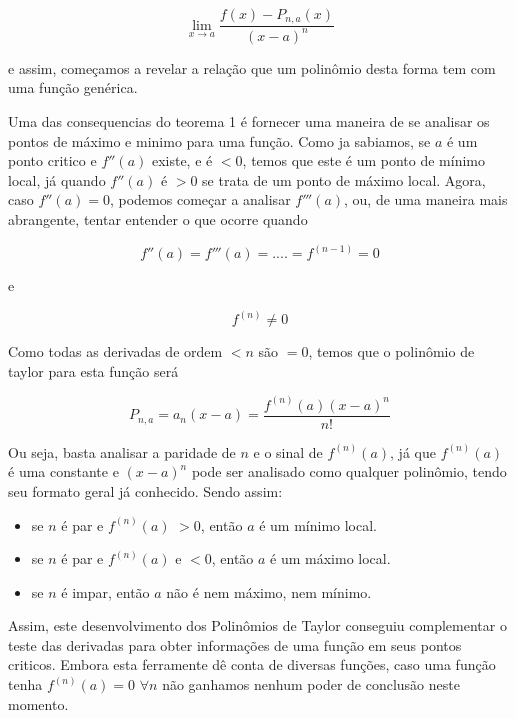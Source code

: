 \documentclass[a4paper, 12pt]{article}
\begin{document}
\begin{equation}
	\nonumber \lim_{x \to a } \frac{f(x) - P_{n,a}(x)}{(x-a)^n}
\end{equation}

e assim, começamos a revelar a relação que um polinômio desta forma tem com uma
função genérica.

Uma das consequencias do teorema 1 é fornecer uma maneira de se analisar os pontos de
máximo e minimo para uma função. Como ja sabiamos, se $a$ é um ponto critico e $f''(a)$ existe,
e é $ < 0$, temos que este é um ponto de mínimo local, já quando $f''(a)$ é $ > 0$ se trata de um ponto
de máximo local. Agora, caso $f''(a) = 0$, podemos começar a analisar $f'''(a)$, ou,
de uma maneira mais abrangente, tentar entender o que ocorre quando

\begin{equation}
	\nonumber f''(a) = f'''(a) = .... = f^{(n-1)} = 0
\end{equation}

e

\begin{equation}
	\nonumber f^{(n)} \neq 0
\end{equation}

Como todas as derivadas de ordem $ < n $ são $=0$, temos que o polinômio de taylor para
esta função será

\begin{equation}
	\nonumber P_{n,a} = a_n(x-a) = \frac{f^{(n)}(a)(x-a)^n}{n!}
\end{equation}

Ou seja, basta analisar a paridade de $n$ e o sinal de $f^{(n)}(a)$, já que $f^{(n)}(a)$
é uma constante e $(x-a)^n$ pode ser analisado como qualquer polinômio, tendo seu
formato geral já conhecido. Sendo assim:

\begin{itemize}
	\item se $n$ é par e $f^{(n)}(a)$ $>0$, então $a$ é um mínimo local.
	\item se $n$ é par e $f^{(n)}(a)$ e $<0$, então $a$ é um máximo local.
	\item se $n$ é impar, então $a$ não é nem máximo, nem mínimo.
\end{itemize}

Assim, este desenvolvimento dos Polinômios de Taylor conseguiu complementar o teste das
derivadas para obter informações de uma função em seus pontos criticos. Embora esta
ferramente dê conta de diversas funções, caso uma função tenha $f^{(n)}(a) = 0$ $ \forall n$
não ganhamos nenhum poder de conclusão neste momento.
\end{document}
